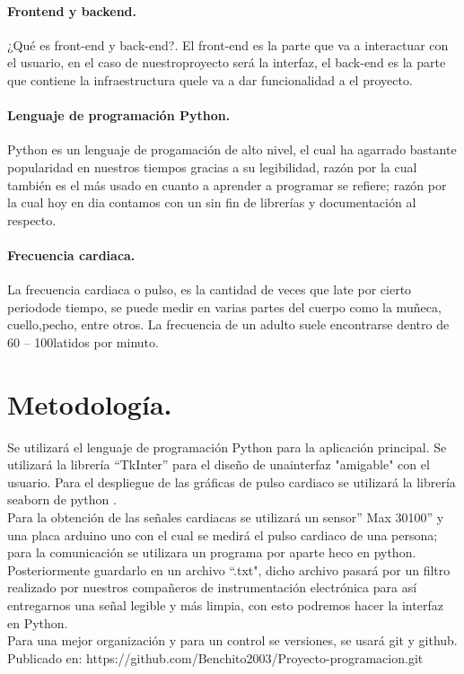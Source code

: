 \documentclass{article}
\begin{document}
		\paragraph{Frontend y backend.} ¿Qué es front-end y back-end?. El front-end es la parte que va a interactuar con el usuario, en el caso de nuestroproyecto será la interfaz, el back-end es la parte que contiene la infraestructura quele va a dar funcionalidad a el proyecto. \cite{FrontendBackend}
		\paragraph{Lenguaje de programación Python.} Python es un lenguaje de progamación de alto nivel, el cual ha agarrado bastante popularidad en nuestros tiempos gracias a su legibilidad, razón por la cual también es el más usado en cuanto a aprender a programar se refiere; razón por la cual hoy en dia contamos con un sin fin de librerías y documentación al respecto. \cite{python3}
		\paragraph{Frecuencia cardiaca.} La frecuencia cardiaca o pulso, es la cantidad de veces que late por cierto periodode tiempo, se puede medir en varias partes del cuerpo como la muñeca, cuello,pecho, entre otros. La frecuencia de un adulto suele encontrarse dentro de 60 – 100latidos por minuto.\cite{FrecuenciaCardiaca}
			
	\section{Metodología.}
	Se utilizará el lenguaje de programación Python \cite{python3} para la aplicación principal. Se utilizará la librería “TkInter”\cite{tkinter} para el diseño de unainterfaz "amigable" con el usuario. Para el despliegue de las gráficas de pulso cardiaco se utilizará la librería seaborn de python \cite{Seaborn}.\\
	Para la obtención de las señales cardiacas se utilizará un sensor” Max 30100” y una placa arduino uno con el cual se medirá el pulso cardiaco de una persona; para la comunicación se utilizara un programa por aparte heco en python. Posteriormente guardarlo en un archivo “.txt", dicho archivo pasará por un filtro realizado por nuestros compañeros de instrumentación electrónica para así entregarnos una señal legible y más limpia, con esto podremos hacer la interfaz en Python.\\
	Para una mejor organización y para un control se versiones, se usará git y github. Publicado en: https://github.com/Benchito2003/Proyecto-programacion.git
	
\end{document}
